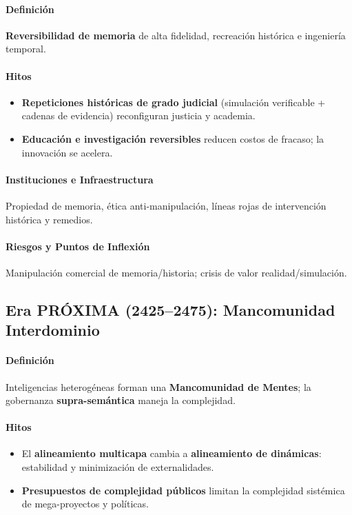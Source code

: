 \documentclass[11pt]{article}
\begin{document}
\paragraph{Definición} \textbf{Reversibilidad de memoria} de alta fidelidad, recreación histórica e ingeniería temporal.

\paragraph{Hitos}
\begin{itemize}[noitemsep]
  \item \textbf{Repeticiones históricas de grado judicial} (simulación verificable + cadenas de evidencia) reconfiguran justicia y academia.
  \item \textbf{Educación e investigación reversibles} reducen costos de fracaso; la innovación se acelera.
\end{itemize}

\paragraph{Instituciones e Infraestructura} Propiedad de memoria, ética anti-manipulación, líneas rojas de intervención histórica y remedios.

\paragraph{Riesgos y Puntos de Inflexión} Manipulación comercial de memoria/historia; crisis de valor realidad/simulación.

\subsection{Era PRÓXIMA (2425–2475): Mancomunidad Interdominio}
\paragraph{Definición} Inteligencias heterogéneas forman una \textbf{Mancomunidad de Mentes}; la gobernanza \textbf{supra-semántica} maneja la complejidad.

\paragraph{Hitos}
\begin{itemize}[noitemsep]
  \item El \textbf{alineamiento multicapa} cambia a \textbf{alineamiento de dinámicas}: estabilidad y minimización de externalidades.
  \item \textbf{Presupuestos de complejidad públicos} limitan la complejidad sistémica de mega-proyectos y políticas.
\end{itemize}
\end{document}
